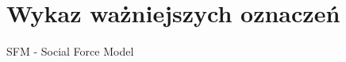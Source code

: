 \chapter{Wykaz ważniejszych oznaczeń}
\label{sec:wykazOznaczen}

SFM - Social Force Model
















